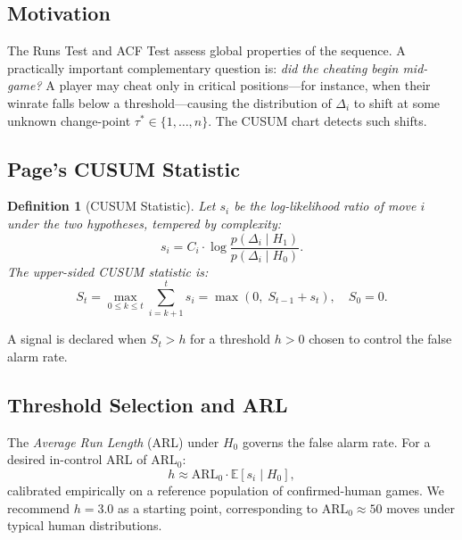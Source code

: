 \documentclass[11pt,a4paper]{article}
\newtheorem{definition}{Definition}
\begin{document}
\subsection{Motivation}

The Runs Test and ACF Test assess global properties of the sequence.
A practically important complementary question is: \emph{did the cheating
begin mid-game?} A player may cheat only in critical positions---for instance,
when their winrate falls below a threshold---causing the distribution of
$\Delta_i$ to shift at some unknown change-point $\tau^* \in \{1, \ldots, n\}$.
The CUSUM chart detects such shifts.

\subsection{Page's CUSUM Statistic}

\begin{definition}[CUSUM Statistic]
Let $s_i$ be the log-likelihood ratio of move $i$ under the two hypotheses,
tempered by complexity:
\begin{equation}
  s_i = C_i \cdot \log \frac{p(\Delta_i \mid H_1)}{p(\Delta_i \mid H_0)}.
  \label{eq:cusum_score}
\end{equation}
The upper-sided CUSUM statistic is:
\begin{equation}
  S_t = \max_{0 \leq k \leq t} \sum_{i=k+1}^{t} s_i
  = \max(0,\; S_{t-1} + s_t), \quad S_0 = 0.
  \label{eq:cusum_recursion}
\end{equation}
\end{definition}

A signal is declared when $S_t > h$ for a threshold $h > 0$ chosen to
control the false alarm rate.

\subsection{Threshold Selection and ARL}

The \emph{Average Run Length} (ARL) under $H_0$ governs the false alarm
rate. For a desired in-control ARL of $\mathrm{ARL}_0$:
\begin{equation}
  h \approx \mathrm{ARL}_0 \cdot \mathbb{E}[s_i \mid H_0],
\end{equation}
calibrated empirically on a reference population of confirmed-human games.
We recommend $h = 3.0$ as a starting point, corresponding to
$\mathrm{ARL}_0 \approx 50$ moves under typical human distributions.
\end{document}
